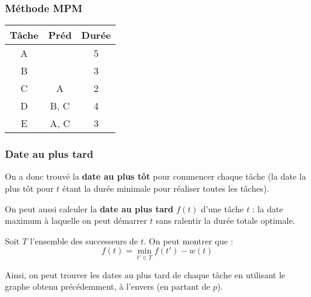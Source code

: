 \documentclass[draft]{beamer}
\begin{document}
\begin{frame}[fragile]
    \frametitle{Méthode MPM}
    \begin{table}[]
        \begin{tabular}{|c|c|c|}
            \hline
            Tâche & Préd & Durée \\ \hline
            A     &      & 5     \\ \hline
            B     &      & 3     \\ \hline
            C     & A    & 2     \\ \hline
            D     & B, C & 4     \\ \hline
            E     & A, C & 3     \\ \hline
        \end{tabular}
    \end{table}
    \pause

    \begin{figure}
    \end{figure}

    \color{red}{Dates au plus tôt pour démarrer chaque tâche}
\end{frame}

\begin{frame}[fragile]
    \frametitle{Date au plus tard}
    On a donc trouvé la \textbf{date au plus tôt} pour commencer chaque tâche (la date la plus tôt pour $t$ étant la durée minimale pour réaliser toutes les tâches).
    \vspace{\baselineskip}

    On peut aussi calculer la \textbf{date au plus tard} $f(t)$ d'une tâche $t$ : la date maximum à laquelle on peut démarrer $t$ sans ralentir la durée totale optimale.
    \pause

    Soit $T$ l'ensemble des successeurs de $t$. On peut montrer que :
    $$\boxed{f(t) = \min_{t' \in T} f(t') - w(t)}$$
    \pause

    Ainsi, on peut trouver les dates au plus tard de chaque tâche en utilisant le graphe obtenu précédemment, à l'envers (en partant de $p$).
\end{frame}
\end{document}
